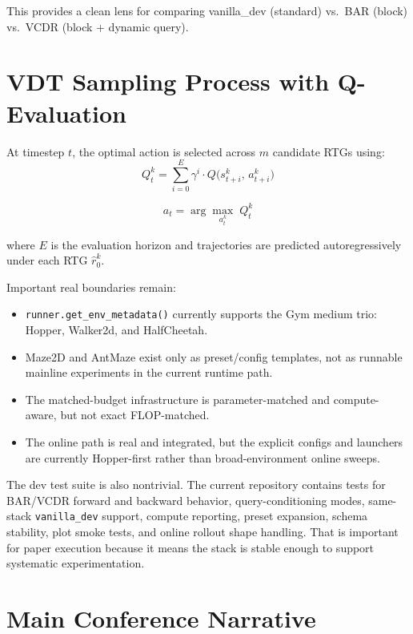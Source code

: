 \documentclass[11pt]{article}
\newcommand{\vanilla}{\texttt{vanilla\_dev}}
\begin{document}
This provides a clean lens for comparing vanilla\_dev (standard) vs.\ BAR (block) vs.\ VCDR (block + dynamic query).


\section{VDT Sampling Process with Q-Evaluation}

At timestep $t$, the optimal action is selected across $m$ candidate RTGs using:
\begin{equation}
    Q_t^k = \sum_{i=0}^{E} \gamma^i \cdot Q\!\big(s_{t+i}^k,\, a_{t+i}^k\big)
\end{equation}

\begin{equation}
    a_t = \arg\max_{a_t^k}\; Q_t^k
\end{equation}

where $E$ is the evaluation horizon and trajectories are predicted autoregressively under each RTG $\hat{r}_0^k$.

\bigskip
\bigskip
\bigskip
Important real boundaries remain:

\begin{itemize}
  \item \texttt{runner.get\_env\_metadata()} currently supports the Gym medium trio: Hopper, Walker2d, and HalfCheetah.
  \item Maze2D and AntMaze exist only as preset/config templates, not as runnable mainline experiments in the current runtime path.
  \item The matched-budget infrastructure is parameter-matched and compute-aware, but not exact FLOP-matched.
  \item The online path is real and integrated, but the explicit configs and launchers are currently Hopper-first rather than broad-environment online sweeps.
\end{itemize}

The dev test suite is also nontrivial. The current repository contains tests for BAR/VCDR forward and backward behavior, query-conditioning modes, same-stack \vanilla{} support, compute reporting, preset expansion, schema stability, plot smoke tests, and online rollout shape handling. That is important for paper execution because it means the stack is stable enough to support systematic experimentation.

\section{Main Conference Narrative}
\end{document}
